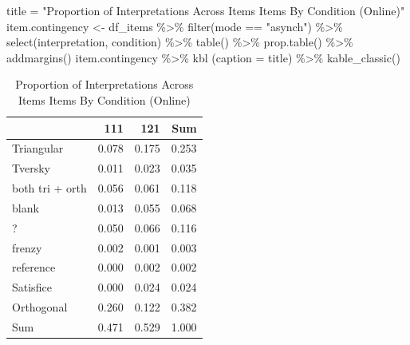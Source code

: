 \documentclass[
  letterpaper,
  DIV=11,
  numbers=noendperiod]{scrreprt}
\newenvironment{Shaded}{\begin{snugshade}}{\end{snugshade}}
\newcommand{\AttributeTok}[1]{\textcolor[rgb]{0.40,0.45,0.13}{#1}}
\newcommand{\FunctionTok}[1]{\textcolor[rgb]{0.28,0.35,0.67}{#1}}
\newcommand{\NormalTok}[1]{\textcolor[rgb]{0.00,0.23,0.31}{#1}}
\newcommand{\OtherTok}[1]{\textcolor[rgb]{0.00,0.23,0.31}{#1}}
\newcommand{\SpecialCharTok}[1]{\textcolor[rgb]{0.37,0.37,0.37}{#1}}
\newcommand{\StringTok}[1]{\textcolor[rgb]{0.13,0.47,0.30}{#1}}
\begin{document}
\begin{Shaded}
\begin{Highlighting}[]
\NormalTok{title }\OtherTok{=} \StringTok{"Proportion of Interpretations Across Items Items By Condition (Online)"}
\NormalTok{item.contingency }\OtherTok{\textless{}{-}}\NormalTok{ df\_items }\SpecialCharTok{\%\textgreater{}\%} \FunctionTok{filter}\NormalTok{(mode }\SpecialCharTok{==} \StringTok{"asynch"}\NormalTok{) }\SpecialCharTok{\%\textgreater{}\%} \FunctionTok{select}\NormalTok{(interpretation, condition) }\SpecialCharTok{\%\textgreater{}\%} \FunctionTok{table}\NormalTok{() }\SpecialCharTok{\%\textgreater{}\%} \FunctionTok{prop.table}\NormalTok{() }\SpecialCharTok{\%\textgreater{}\%} \FunctionTok{addmargins}\NormalTok{()}
\NormalTok{item.contingency }\SpecialCharTok{\%\textgreater{}\%} \FunctionTok{kbl}\NormalTok{ (}\AttributeTok{caption =}\NormalTok{ title) }\SpecialCharTok{\%\textgreater{}\%} \FunctionTok{kable\_classic}\NormalTok{()}
\end{Highlighting}
\end{Shaded}

\begin{table}

\caption{Proportion of Interpretations Across Items Items By Condition (Online)}
\centering
\begin{tabular}[t]{l|r|r|r}
\hline
  & 111 & 121 & Sum\\
\hline
Triangular & 0.078 & 0.175 & 0.253\\
\hline
Tversky & 0.011 & 0.023 & 0.035\\
\hline
both tri + orth & 0.056 & 0.061 & 0.118\\
\hline
blank & 0.013 & 0.055 & 0.068\\
\hline
? & 0.050 & 0.066 & 0.116\\
\hline
frenzy & 0.002 & 0.001 & 0.003\\
\hline
reference & 0.000 & 0.002 & 0.002\\
\hline
Satisfice & 0.000 & 0.024 & 0.024\\
\hline
Orthogonal & 0.260 & 0.122 & 0.382\\
\hline
Sum & 0.471 & 0.529 & 1.000\\
\hline
\end{tabular}
\end{table}
\end{document}
